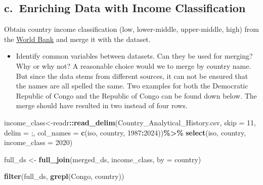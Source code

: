 \documentclass[
]{article}
\newenvironment{Shaded}{\begin{snugshade}}{\end{snugshade}}
\newcommand{\AttributeTok}[1]{\textcolor[rgb]{0.13,0.29,0.53}{#1}}
\newcommand{\DecValTok}[1]{\textcolor[rgb]{0.00,0.00,0.81}{#1}}
\newcommand{\FunctionTok}[1]{\textcolor[rgb]{0.13,0.29,0.53}{\textbf{#1}}}
\newcommand{\NormalTok}[1]{#1}
\newcommand{\OtherTok}[1]{\textcolor[rgb]{0.56,0.35,0.01}{#1}}
\newcommand{\SpecialCharTok}[1]{\textcolor[rgb]{0.81,0.36,0.00}{\textbf{#1}}}
\newcommand{\StringTok}[1]{\textcolor[rgb]{0.31,0.60,0.02}{#1}}
\providecommand{\tightlist}{%
  \setlength{\itemsep}{0pt}\setlength{\parskip}{0pt}}
\begin{document}
\subsection{c.~Enriching Data with Income
Classification}\label{c.-enriching-data-with-income-classification}

Obtain country income classification (low, lower-middle, upper-middle,
high) from the
\href{https://datahelpdesk.worldbank.org/knowledgebase/articles/906519}{World
Bank} and merge it with the dataset.

\begin{itemize}
\tightlist
\item
  Identify common variables between datasets. Can they be used for
  merging? Why or why not? A reasonable choice would we to merge by
  country name. But since the data stems from different sources, it can
  not be ensured that the names are all spelled the same. Two examples
  for both the Democratic Republic of Congo and the Republic of Congo
  can be found down below. The merge should have resulted in two instead
  of four rows.
\end{itemize}

\begin{Shaded}
\begin{Highlighting}[]
\NormalTok{income\_class}\OtherTok{\textless{}{-}}\NormalTok{readr}\SpecialCharTok{::}\FunctionTok{read\_delim}\NormalTok{(}\StringTok{\textquotesingle{}Country\_Analytical\_History.csv\textquotesingle{}}\NormalTok{, }\AttributeTok{skip =} \DecValTok{11}\NormalTok{, }\AttributeTok{delim =} \StringTok{\textquotesingle{};\textquotesingle{}}\NormalTok{, }\AttributeTok{col\_names =} \FunctionTok{c}\NormalTok{(}\StringTok{\textquotesingle{}iso\textquotesingle{}}\NormalTok{, }\StringTok{\textquotesingle{}country\textquotesingle{}}\NormalTok{, }\StringTok{\textquotesingle{}1987\textquotesingle{}}\SpecialCharTok{:}\StringTok{\textquotesingle{}2024\textquotesingle{}}\NormalTok{))}\SpecialCharTok{\%\textgreater{}\%}
  \FunctionTok{select}\NormalTok{(iso, country, }\StringTok{\textquotesingle{}income\_class\textquotesingle{}} \OtherTok{=} \StringTok{\textquotesingle{}2020\textquotesingle{}}\NormalTok{)}

\NormalTok{full\_ds }\OtherTok{\textless{}{-}} \FunctionTok{full\_join}\NormalTok{(merged\_ds, income\_class, }\AttributeTok{by =} \StringTok{\textquotesingle{}country\textquotesingle{}}\NormalTok{)}

\FunctionTok{filter}\NormalTok{(full\_ds, }\FunctionTok{grepl}\NormalTok{(}\StringTok{\textquotesingle{}Congo\textquotesingle{}}\NormalTok{, country))}
\end{Highlighting}
\end{Shaded}
\end{document}
